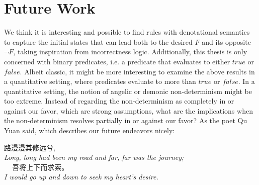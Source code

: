 \section{Future Work}
We think it is interesting and possible to find rules with denotational semantics to capture the initial states that can lead both to the desired $F$ and its opposite $\neg F$, taking inspiration from incorrectness logic.  
Additionally, this thesis is only concerned with binary predicates, i.e. a predicate that evaluates to either $true$ or $false$. 
Albeit classic, it might be more interesting to examine the above results in a quantitative setting, where predicates evaluate to more than $true$ or $false$. 
In a quantitative setting, the notion of angelic or demonic non-determinism might be too extreme. 
Instead of regarding the non-determinism as completely in or against our favor, which are strong assumptions, what are the implications when the non-determinism resolves partially in or against our favor? 
As the poet Qu Yuan said, which describes our future endeavors nicely: 
\begin{center}
    路漫漫其修远兮,\\
    \textit{Long, long had been my road and far, far was the journey;} \\ 
    \ \ \,吾将上下而求索。\\
    \textit{I would go up and down to seek my heart’s desire.}~\cite{hawkes2012}
\end{center}




